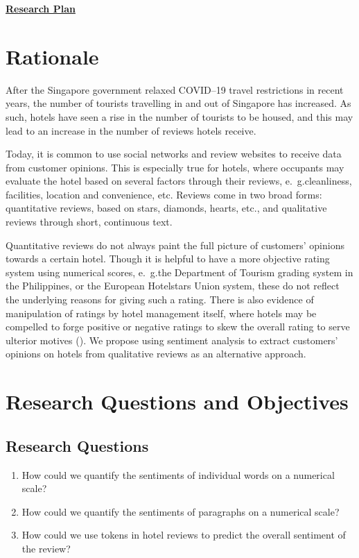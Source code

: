 \documentclass[
	fontsize=12pt,
	paper=a4,
	bibliography=totocnumbered, 
]{scrartcl}
\newcommand{\eg}{e.~g.\space}
\begin{document}
			\pagestyle{scrheadings}
			\onehalfspacing

			{
				\noindent
				\LARGE\textbf{\underline{Research Plan}}
				}

				\section{Rationale}

				After the Singapore government relaxed COVID--19 travel restrictions in recent years,
				the number of tourists travelling in and out of Singapore has increased.
				As such, hotels have seen a rise in the number of tourists to be housed,
				and this may lead to an increase in the number of reviews hotels receive.

				Today, it is common to use social networks and review websites
				to receive data from customer opinions. This is especially true for hotels,
				where occupants may evaluate the hotel based on several factors through their
				reviews, \eg cleanliness, facilities, location and convenience, etc.
				Reviews come in two broad forms: quantitative reviews, based on stars, diamonds, hearts, etc., and
				qualitative reviews through short, continuous text.

				Quantitative reviews do not always paint the full picture of customers'
				opinions towards a certain hotel. Though it is helpful to have a more
				objective rating system using numerical scores, \eg the Department of Tourism grading system in
				the Philippines, or the European Hotelstars Union system,
				these do not reflect the underlying reasons for giving such a rating.
				There is also evidence of manipulation of ratings by hotel management itself, where hotels may be
				compelled to forge positive or negative ratings to skew the overall rating to serve ulterior motives (\cite{tripadvisor}).
				We propose using sentiment analysis to extract customers' opinions on hotels from qualitative reviews as an
				alternative approach.

				\section{Research Questions and Objectives}

				\subsection{Research Questions}
				\begin{enumerate}
					\item How could we quantify the sentiments of individual words on a numerical scale?
					\item How could we quantify the sentiments of paragraphs on a numerical scale?
					\item How could we use tokens in hotel reviews to predict the overall sentiment of the review?
				\end{enumerate}
\end{document}
